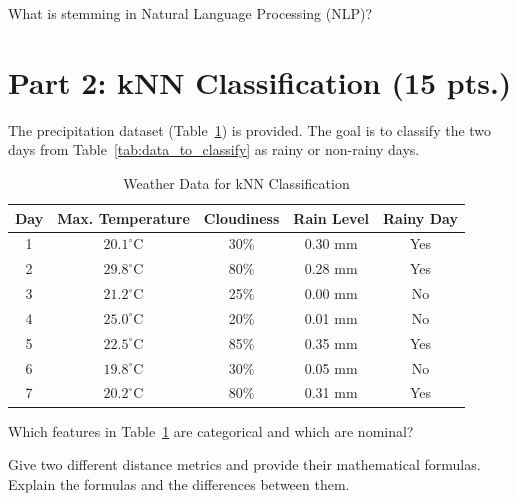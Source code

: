 \documentclass[12pt]{article}
\begin{document}
    \begin{ejercicio}[Stemming (1 pt.)]
        What is stemming in Natural Language Processing (NLP)?
    \end{ejercicio}

    \newpage


    \section*{Part 2: kNN Classification (15 pts.)}

    The precipitation dataset (Table~\ref{tab:weather_data}) is provided. The goal is to classify the two days from Table~\ref{tab:data_to_classify} as rainy or non-rainy days.

    \begin{table}[h!]
    \centering
    \begin{tabular}{|c|c|c|c|c|}
    \hline
    \textbf{Day} & \textbf{Max. Temperature} & \textbf{Cloudiness} & \textbf{Rain Level} & \textbf{Rainy Day} \\ \hline
    1 & $20.1^{\circ}\text{C}$ & 30\% & 0.30 mm & Yes \\ \hline
    2 & $29.8^{\circ}\text{C}$ & 80\% & 0.28 mm & Yes \\ \hline
    3 & $21.2^{\circ}\text{C}$ & 25\% & 0.00 mm & No \\ \hline
    4 & $25.0^{\circ}\text{C}$ & 20\% & 0.01 mm & No \\ \hline
    5 & $22.5^{\circ}\text{C}$ & 85\% & 0.35 mm & Yes \\ \hline
    6 & $19.8^{\circ}\text{C}$ & 30\% & 0.05 mm & No \\ \hline
    7 & $20.2^{\circ}\text{C}$ & 80\% & 0.31 mm & Yes \\ \hline
    \end{tabular}
    \caption{Weather Data for kNN Classification}
    \label{tab:weather_data}
    \end{table}

    \begin{ejercicio}
        Which features in Table~\ref{tab:weather_data} are categorical and which are nominal?
    \end{ejercicio}

    \begin{ejercicio}
        Give two different distance metrics and provide their mathematical formulas. Explain the formulas and the differences between them.
    \end{ejercicio}
\end{document}
